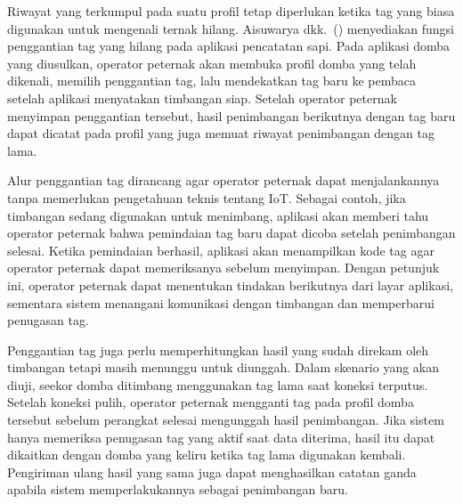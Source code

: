 Riwayat yang terkumpul pada suatu profil tetap diperlukan ketika tag yang
biasa digunakan untuk mengenali ternak hilang. Aisuwarya
dkk.~(\citeyear{aisuwarya2019rfid}) menyediakan fungsi penggantian tag yang
hilang pada aplikasi pencatatan sapi. Pada aplikasi domba yang diusulkan,
{\setlength{\fboxsep}{1pt}\colorbox{revisilama}{operator}} {\setlength{\fboxsep}{1pt}\colorbox{revisibaru}{peternak}} akan membuka profil domba yang telah dikenali, memilih penggantian
tag, lalu mendekatkan tag baru ke pembaca setelah aplikasi menyatakan
timbangan siap. Setelah {\setlength{\fboxsep}{1pt}\colorbox{revisilama}{operator}} {\setlength{\fboxsep}{1pt}\colorbox{revisibaru}{peternak}} menyimpan penggantian tersebut, hasil
penimbangan berikutnya dengan tag baru dapat dicatat pada profil yang juga
memuat riwayat penimbangan dengan tag lama.

Alur penggantian tag dirancang agar {\setlength{\fboxsep}{1pt}\colorbox{revisilama}{operator}} {\setlength{\fboxsep}{1pt}\colorbox{revisibaru}{peternak}} dapat menjalankannya tanpa %
memerlukan pengetahuan teknis tentang IoT. Sebagai contoh, jika timbangan
sedang digunakan untuk menimbang, aplikasi akan memberi tahu {\setlength{\fboxsep}{1pt}\colorbox{revisilama}{operator}} {\setlength{\fboxsep}{1pt}\colorbox{revisibaru}{peternak}}
bahwa pemindaian tag baru dapat dicoba setelah penimbangan selesai. Ketika
pemindaian berhasil, aplikasi akan menampilkan kode tag agar {\setlength{\fboxsep}{1pt}\colorbox{revisilama}{operator}} {\setlength{\fboxsep}{1pt}\colorbox{revisibaru}{peternak}} dapat
memeriksanya sebelum menyimpan. Dengan petunjuk ini, {\setlength{\fboxsep}{1pt}\colorbox{revisilama}{operator}} {\setlength{\fboxsep}{1pt}\colorbox{revisibaru}{peternak}} dapat
menentukan tindakan berikutnya dari layar aplikasi, sementara sistem
menangani komunikasi dengan timbangan dan memperbarui penugasan tag.

Penggantian tag juga perlu memperhitungkan hasil yang sudah direkam oleh
timbangan tetapi masih menunggu untuk diunggah. Dalam skenario yang akan
diuji, seekor domba ditimbang menggunakan
tag lama saat koneksi terputus. Setelah koneksi pulih, {\setlength{\fboxsep}{1pt}\colorbox{revisilama}{operator}} {\setlength{\fboxsep}{1pt}\colorbox{revisibaru}{peternak}} mengganti tag
pada profil domba tersebut sebelum perangkat selesai mengunggah hasil
penimbangan. Jika sistem hanya memeriksa penugasan tag yang aktif saat data
diterima, hasil itu dapat dikaitkan dengan domba yang keliru ketika tag lama
digunakan kembali. Pengiriman ulang hasil yang sama juga dapat menghasilkan
catatan ganda apabila sistem memperlakukannya sebagai penimbangan baru.

